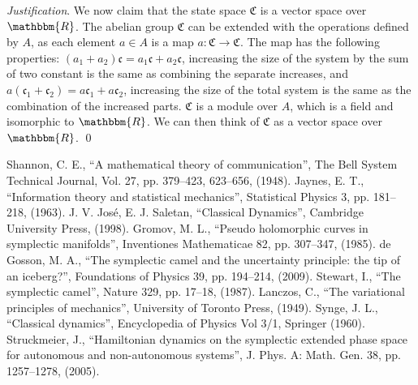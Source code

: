 \documentclass[aps,pra,10pt,twocolumn,floatfix,nofootinbib]{revtex4-1}
\theoremstyle{definition}
\newenvironment{justification}{\emph{Justification}.}{\qed}
\begin{document}
\begin{justification}
We now claim that the state space $\mathfrak{C}$ is a vector space over $\mathbbm{R}$. The abelian group $\mathfrak{C}$ can be extended with the operations defined by $A$, as each element $a \in A$ is a map $a : \mathfrak{C} \rightarrow \mathfrak{C}$. The map has the following properties: $(a_1 + a_2) \mathfrak{c} = a_1 \mathfrak{c} + a_2 \mathfrak{c}$, increasing the size of the system by the sum of two constant is the same as combining the separate increases, and $a (\mathfrak{c}_1 + \mathfrak{c}_2) = a \mathfrak{c}_1 + a \mathfrak{c}_2$, increasing the size of the total system is the same as the combination of the increased parts. $\mathfrak{C}$ is a module over $A$, which is a field and isomorphic to $\mathbbm{R}$. We can then think of $\mathfrak{C}$ as a vector space over $\mathbbm{R}$.
\end{justification}


\begin{thebibliography}{0}

 Shannon, C. E., ``A mathematical theory of communication'', The Bell System Technical Journal, Vol. 27, pp. 379--423, 623--656, (1948).
 Jaynes, E. T., ``Information theory and statistical mechanics'', Statistical Physics 3, pp. 181--218, (1963).
 J. V. Jos\'{e}, E. J. Saletan, ``Classical Dynamics'', Cambridge University Press, (1998).
 Gromov, M. L., ``Pseudo holomorphic curves in symplectic manifolds'', Inventiones Mathematicae 82, pp. 307--347, (1985).
 de Gosson, M. A., ``The symplectic camel and the uncertainty principle: the tip of an iceberg?'', Foundations of Physics 39, pp. 194--214, (2009).
 Stewart, I., ``The symplectic camel'', Nature 329, pp. 17--18, (1987).
 Lanczos, C., ``The variational principles of mechanics'', University of Toronto Press, (1949).
 Synge, J. L., ``Classical dynamics'', Encyclopedia of Physics Vol 3/1, Springer (1960).
 Struckmeier, J., ``Hamiltonian dynamics on the symplectic extended phase space for autonomous and non-autonomous systems'', J. Phys. A: Math. Gen. 38, pp. 1257--1278, (2005).

\end{thebibliography}
\end{document}
